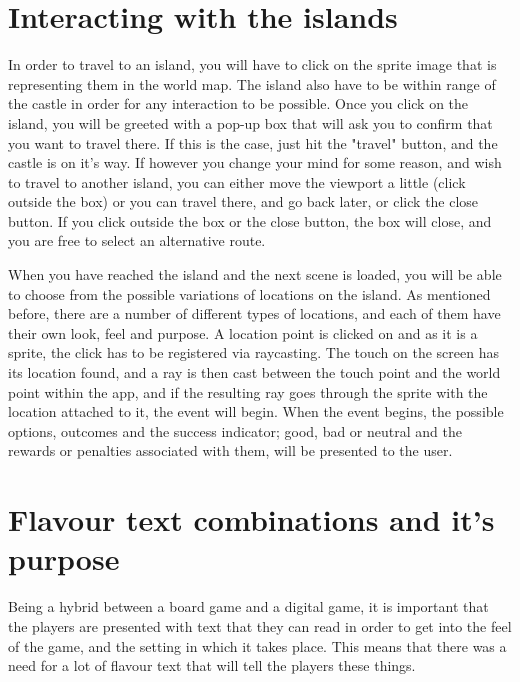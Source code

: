 \documentclass[a4paper,11pt]{report}
\begin{document}
\section{Interacting with the islands}
In order to travel to an island, you will have to click on the sprite image that is representing them in the world map. The island also have to be within range of the castle in order for any interaction to be possible. 
Once you click on the island, you will be greeted with a pop-up box that will ask you to confirm that you want to travel there. If this is the case, just hit the "travel" button, and the castle is on it's way. If however you change your mind for some reason, and wish to travel to another island, you can either move the viewport a little (click outside the box) or you can travel there, and go back later, or click the close button. If you click outside the box or the close button, the box will close, and you are free to select an alternative route.

When you have reached the island and the next scene is loaded, you will be able to choose from the possible variations of locations on the island. As mentioned before, there are a number of different types of locations, and each of them have their own look, feel and purpose.
A location point is clicked on and as it is a sprite, the click has to be registered via raycasting. The touch on the screen has its location found, and a ray is then cast between the touch point and the world point within the app, and if the resulting ray goes through the sprite with the location attached to it, the event will begin. When the event begins, the possible options, outcomes and the success indicator; good, bad or neutral and the rewards or penalties associated with them, will be presented to the user.

\section{Flavour text combinations and it's purpose}
Being a hybrid between a board game and a digital game, it is important that the players are presented with text that they can read in order to get into the feel of the game, and the setting in which it takes place. This means that there was a need for a lot of flavour text that will tell the players these things. 
\end{document}
